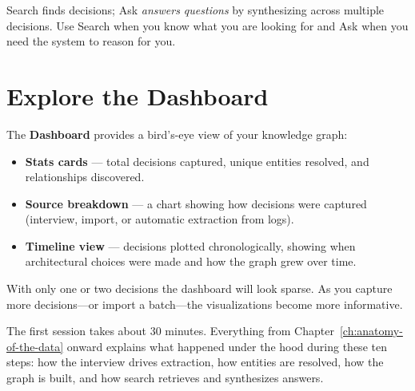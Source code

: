 \begin{keyinsight}
Search finds decisions; Ask \emph{answers questions} by synthesizing across
multiple decisions.  Use Search when you know what you are looking for and Ask
when you need the system to reason for you.
\end{keyinsight}


\section{Explore the Dashboard}
\label{sec:explore-dashboard}

The \textbf{Dashboard} provides a bird's-eye view of your knowledge graph:

\begin{itemize}
    \item \textbf{Stats cards} --- total decisions captured, unique entities
          resolved, and relationships discovered.
    \item \textbf{Source breakdown} --- a chart showing how decisions were
          captured (interview, import, or automatic extraction from logs).
    \item \textbf{Timeline view} --- decisions plotted chronologically, showing
          when architectural choices were made and how the graph grew over time.
\end{itemize}

With only one or two decisions the dashboard will look sparse.  As you capture
more decisions---or import a batch---the visualizations become more informative.

\begin{keyinsight}
The first session takes about 30 minutes.  Everything from
Chapter~\ref{ch:anatomy-of-the-data} onward explains what happened under the
hood during these ten steps: how the interview drives extraction, how entities
are resolved, how the graph is built, and how search retrieves and synthesizes
answers.
\end{keyinsight}
